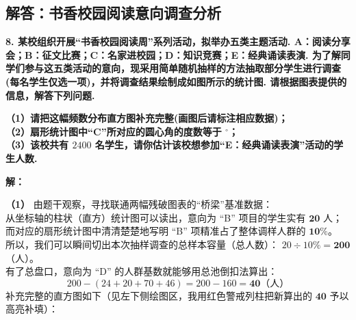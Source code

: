 \newpage

\newpage

\subsection{解答：书香校园阅读意向调查分析}

\vspace{0.6cm}

\textbf{8. 某校组织开展“书香校园阅读周”系列活动，拟举办五类主题活动. A：阅读分享会；B：征文比赛；C：名家进校园；D：知识竞赛；E：经典诵读表演. 为了解同学们参与这五类活动的意向，现采用简单随机抽样的方法抽取部分学生进行调查(每名学生仅选一项)，并将调查结果绘制成如图所示的统计图. 请根据图表提供的信息，解答下列问题.}

\vspace{0.4cm}

\textbf{（1）请把这幅频数分布直方图补充完整(画图后请标注相应数据)；\\
（2）扇形统计图中“C”所对应的圆心角的度数等于 \underline{\makebox[1.5cm]{}}$^\circ$；\\
（3）该校共有 $2400$ 名学生，请你估计该校想参加“E：经典诵读表演”活动的学生人数.}

\vspace{0.4cm}
\textbf{解：}

\textbf{（1）} 由题干观察，寻找联通两幅残破图表的“桥梁”基准数据：\\
从坐标轴的柱状（直方）统计图可以读出，意向为 “B” 项目的学生实有 $\boldsymbol{20}$ 人；而对应的扇形统计图中清清楚楚地写明 “B” 项精准占了整体调样人群的 $\boldsymbol{10\%}$。\\
所以，我们可以瞬间切出本次抽样调查的总样本容量（总人数）： $20 \div 10\% = \boldsymbol{200}$（人）。\\
有了总盘口，意向为 “D” 的人群基数就能够用总池倒扣法算出：
$$200 - (24 + 20 + 70 + 46) = 200 - 160 = \boldsymbol{40}\text{（人）}$$
补充完整的直方图如下（见左下侧绘图区，我用红色警戒列柱把新算出的 $\boldsymbol{40}$ 予以高亮补填）：

\vspace{0.4cm}

